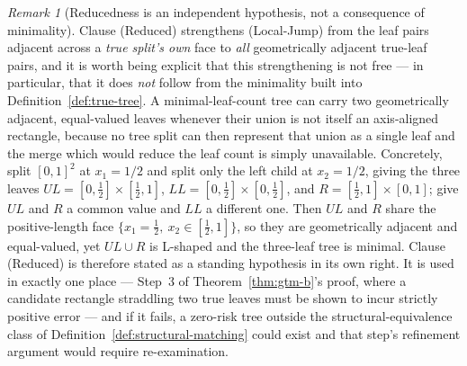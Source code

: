 \documentclass[11pt]{article}
\theoremstyle{plain}
\theoremstyle{definition}
\theoremstyle{remark}
\newtheorem{remark}[theorem]{Remark}
\begin{document}
\begin{remark}[Reducedness is an independent hypothesis, not a consequence of
minimality]\label{rem:reduced-independent}
Clause (Reduced) strengthens (Local-Jump) from the leaf pairs adjacent across
a \emph{true split's own} face to \emph{all} geometrically adjacent true-leaf
pairs, and it is worth being explicit that this strengthening is not free ---
in particular, that it does \emph{not} follow from the minimality built into
Definition~\ref{def:true-tree}. A minimal-leaf-count tree can carry two
geometrically adjacent, equal-valued leaves whenever their union is not
itself an axis-aligned rectangle, because no tree split can then represent
that union as a single leaf and the merge which would reduce the leaf count is
simply unavailable. Concretely, split \([0,1]^2\) at \(x_1=1/2\) and split
only the left child at \(x_2=1/2\), giving the three leaves
\(UL=[0,\tfrac12]\times[\tfrac12,1]\),
\(LL=[0,\tfrac12]\times[0,\tfrac12]\), and \(R=[\tfrac12,1]\times[0,1]\);
give \(UL\) and \(R\) a common value and \(LL\) a different one. Then \(UL\)
and \(R\) share the positive-length face
\(\{x_1=\tfrac12,\ x_2\in[\tfrac12,1]\}\), so they are geometrically
adjacent and equal-valued, yet \(UL\cup R\) is L-shaped and the three-leaf
tree is minimal. Clause (Reduced) is therefore stated as a standing
hypothesis in its own right. It is used in exactly one place ---
Step~3 of Theorem~\ref{thm:gtm-b}'s proof, where a candidate rectangle
straddling two true leaves must be shown to incur strictly positive error ---
and if it fails, a zero-risk tree outside the structural-equivalence class of
Definition~\ref{def:structural-matching} could exist and that step's
refinement argument would require re-examination.
\end{remark}
\end{document}
